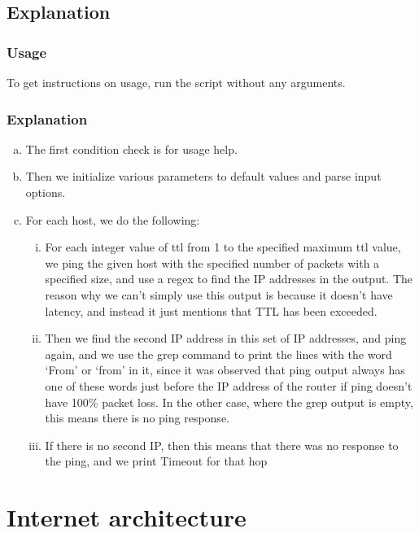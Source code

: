 \documentclass[a4paper]{article}
\begin{document}
\subsection{Explanation}

\subsubsection{Usage}

To get instructions on usage, run the script without any arguments.

\subsubsection{Explanation}

\begin{enumerate}[a.]
    \item The first condition check is for usage help.
    \item Then we initialize various parameters to default values and parse input options.
    \item For each host, we do the following:
        \begin{enumerate}[i.]
            \item For each integer value of ttl from 1 to the specified maximum ttl value, we ping the given host with the specified number of packets with a specified size, and use a regex to find the IP addresses in the output. The reason why we can't simply use this output is because it doesn't have latency, and instead it just mentions that TTL has been exceeded.
            \item Then we find the second IP address in this set of IP addresses, and ping again, and we use the grep command to print the lines with the word `From' or `from' in it, since it was observed that ping output always has one of these words just before the IP address of the router if ping doesn't have 100\% packet loss. In the other case, where the grep output is empty, this means there is no ping response.
            \item If there is no second IP, then this means that there was no response to the ping, and we print Timeout for that hop
        \end{enumerate}
\end{enumerate}

\pagebreak

\section{Internet architecture}
\end{document}
